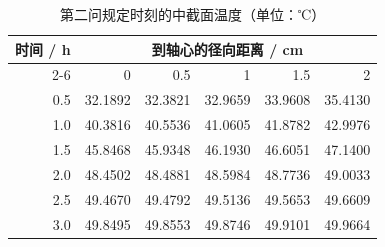 \begin{table}[htbp]
  \centering
  \caption{第二问规定时刻的中截面温度（单位：℃）}
  \label{tab:q2-temperature}
  \small
  \begin{tabular}{rrrrrr}
    \toprule
    时间 / h & \multicolumn{5}{c}{到轴心的径向距离 / cm} \\
    \cmidrule(lr){2-6}
    & 0 & 0.5 & 1 & 1.5 & 2 \\
    \midrule
    0.5 & 32.1892 & 32.3821 & 32.9659 & 33.9608 & 35.4130 \\
    1.0 & 40.3816 & 40.5536 & 41.0605 & 41.8782 & 42.9976 \\
    1.5 & 45.8468 & 45.9348 & 46.1930 & 46.6051 & 47.1400 \\
    2.0 & 48.4502 & 48.4881 & 48.5984 & 48.7736 & 49.0033 \\
    2.5 & 49.4670 & 49.4792 & 49.5136 & 49.5653 & 49.6609 \\
    3.0 & 49.8495 & 49.8553 & 49.8746 & 49.9101 & 49.9664 \\
    \bottomrule
  \end{tabular}
\end{table}
